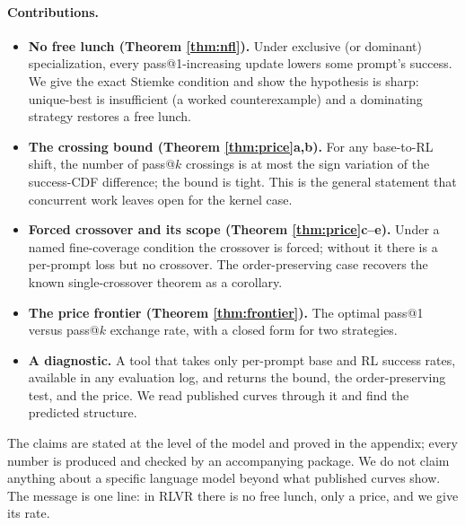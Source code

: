\paragraph{Contributions.}
\begin{itemize}
\item \textbf{No free lunch (Theorem \ref{thm:nfl}).} Under exclusive (or dominant) specialization,
every pass@1-increasing update lowers some prompt's success. We give the exact
Stiemke condition and show the hypothesis is sharp: unique-best is insufficient
(a worked counterexample) and a dominating strategy restores a
free lunch.
\item \textbf{The crossing bound (Theorem \ref{thm:price}a,b).} For any
base-to-RL shift, the number of pass@$k$ crossings is at most the sign variation
of the success-CDF difference; the bound is tight. This is the general statement
that concurrent work leaves open for the kernel case.
\item \textbf{Forced crossover and its scope (Theorem \ref{thm:price}c--e).}
Under a named fine-coverage condition the crossover is forced; without it there
is a per-prompt loss but no crossover. The order-preserving case recovers the
known single-crossover theorem as a corollary.
\item \textbf{The price frontier (Theorem \ref{thm:frontier}).} The optimal
pass@1 versus pass@$k$ exchange rate, with a closed form for two strategies.
\item \textbf{A diagnostic.} A tool that takes only per-prompt base and RL success
rates, available in any evaluation log, and returns the bound, the
order-preserving test, and the price. We read published curves through it and
find the predicted structure.
\end{itemize}

The claims are stated at the level of the model and proved in the appendix; every
number is produced and checked by an accompanying package. We do not claim
anything about a specific language model beyond what published curves show. The
message is one line: in RLVR there is no free lunch, only a price, and we give
its rate.